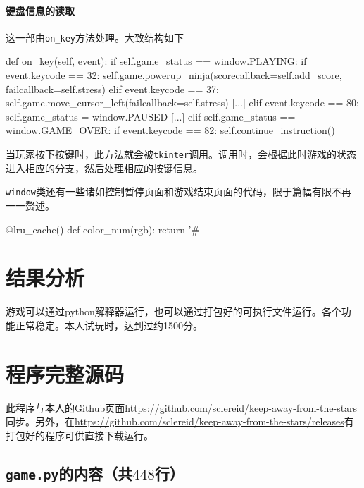 \documentclass[UTF8]{article}
\begin{document}
\paragraph{键盘信息的读取} 这一部由\verb|on_key|方法处理。大致结构如下
\begin{python}
    def on_key(self, event):
        if self.game_status == window.PLAYING:
            if event.keycode == 32:
                self.game.powerup_ninja(scorecallback=self.add_score, failcallback=self.stress)
            elif event.keycode == 37:
                self.game.move_cursor_left(failcallback=self.stress)
            [...]
            elif event.keycode == 80:
                self.game_status = window.PAUSED
        [...]
        elif self.game_status == window.GAME_OVER:
            if event.keycode == 82:
                self.continue_instruction()
\end{python}
当玩家按下按键时，此方法就会被\texttt{tkinter}调用。调用时，会根据此时游戏的状态进入相应的分支，然后处理相应的按键信息。

\texttt{window}类还有一些诸如控制暂停页面和游戏结束页面的代码，限于篇幅有限不再一一赘述。

\begin{python}
@lru_cache()
def color_num(rgb):
    return '#%
\end{python}

\section{结果分析}

游戏可以通过python解释器运行，也可以通过打包好的可执行文件运行。各个功能正常稳定。本人试玩时，达到过约1500分。

\newpage

\section{程序完整源码}
此程序与本人的Github页面\href{https://github.com/sclereid/keep-away-from-the-stars}{https://github.com/sclereid/keep-away-from-the-stars}同步。另外，在\href{https://github.com/sclereid/keep-away-from-the-stars/releases}{https://github.com/sclereid/keep-away-from-the-stars/releases}有打包好的程序可供直接下载运行。
\subsection{\texttt{game.py}的内容（共$448$行）}
\end{document}
